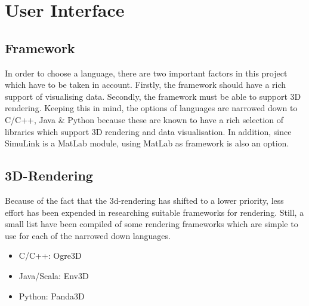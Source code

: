 \section{User Interface}
\subsection{Framework}
In order to choose a language, there are two important factors in this project which have to be taken in account. Firstly, the framework should have a rich support of visualising data. Secondly, the framework must be able to support 3D rendering. Keeping this in mind, the options of languages are narrowed down to C/C++, Java \& Python because these are known to have a rich selection of libraries which support 3D rendering and data visualisation. In addition, since SimuLink is a MatLab module, using MatLab as framework is also an option. 
\subsection{3D-Rendering}
Because of the fact that the 3d-rendering has shifted to a lower priority, less effort has been expended in researching suitable frameworks for rendering. Still, a small list have been compiled of some rendering frameworks which are simple to use for each of the narrowed down languages.
\begin{itemize}
	\item C/C++: Ogre3D
	\item Java/Scala: Env3D
	\item Python: Panda3D
\end{itemize}
